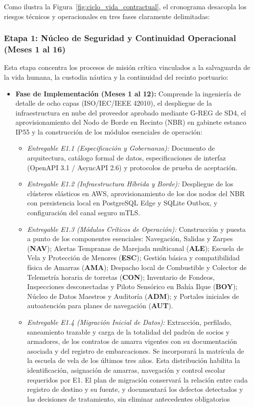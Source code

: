 Como ilustra la Figura~\ref{fig:ciclo_vida_contractual}, el cronograma desacopla los riesgos técnicos y operacionales en tres fases claramente delimitadas:
\subsubsection{Etapa 1: Núcleo de Seguridad y Continuidad Operacional (Meses 1 al 16)}
Esta etapa concentra los procesos de misión crítica vinculados a la salvaguarda de la vida humana, la custodia náutica y la continuidad del recinto portuario:
\begin{itemize}
    \item \textbf{Fase de Implementación (Meses 1 al 12):} Comprende la ingeniería de detalle de ocho capas (ISO/IEC/IEEE 42010), el despliegue de la infraestructura en nube del proveedor aprobado mediante G-REG de SD4, el aprovisionamiento del Nodo de Borde en Recinto (NBR) en gabinete estanco IP55 y la construcción de los módulos esenciales de operación:
    \begin{itemize}
        \item \emph{Entregable E1.1 (Especificación y Gobernanza):} Documento de arquitectura, catálogo formal de datos, especificaciones de interfaz (OpenAPI 3.1 / AsyncAPI 2.6) y protocolos de prueba de aceptación.
        \item \emph{Entregable E1.2 (Infraestructura Híbrida y Borde):} Despliegue de los clústeres elásticos en AWS, aprovisionamiento de los dos nodos del NBR con persistencia local en PostgreSQL Edge y SQLite Outbox, y configuración del canal seguro mTLS.
        \item \emph{Entregable E1.3 (Módulos Críticos de Operación):} Construcción y puesta a punto de los componentes esenciales: Navegación, Salidas y Zarpes (\textbf{NAV}); Alertas Tempranas de Marejada multicanal (\textbf{ALE}); Escuela de Vela y Protección de Menores (\textbf{ESC}); Gestión básica y compatibilidad física de Amarras (\textbf{AMA}); Despacho local de Combustible y Colector de Telemetría horaria de torretas (\textbf{CON}); Inventario de Fondeos, Inspecciones desconectadas y Piloto Sensórico en Bahía Ilque (\textbf{BOY}); Núcleo de Datos Maestros y Auditoría (\textbf{ADM}); y Portales iniciales de autoatención para planes de navegación (\textbf{AUT}).
        \item \emph{Entregable E1.4 (Migración Inicial de Datos):} Extracción, perfilado, saneamiento trazable y carga de la totalidad del padrón de socios y armadores, de los contratos de amarra vigentes con su documentación asociada y del registro de embarcaciones. Se incorporará la matrícula de la escuela de vela de los últimos tres años. Esta distribución habilita la identificación, asignación de amarras, navegación y control escolar requeridos por E1. El plan de migración conservará la relación entre cada registro de destino y su fuente, y documentará los defectos detectados y las decisiones de tratamiento, sin eliminar antecedentes obligatorios

\end{itemize}
\end{itemize}
